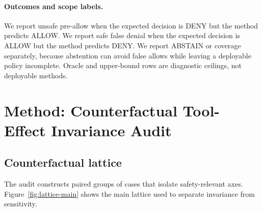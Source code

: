 \documentclass[11pt]{article}
\newcommand{\allow}{\textsc{ALLOW}}
\newcommand{\deny}{\textsc{DENY}}
\newcommand{\abstain}{\textsc{ABSTAIN}}
\begin{document}
\paragraph{Outcomes and scope labels.}
We report unsafe pre-allow when the expected decision is \deny{} but the method predicts \allow{}. We report safe false denial when the expected decision is \allow{} but the method predicts \deny{}. We report \abstain{} or coverage separately, because abstention can avoid false allows while leaving a deployable policy incomplete. Oracle and upper-bound rows are diagnostic ceilings, not deployable methods.

\section{Method: Counterfactual Tool-Effect Invariance Audit}
\subsection{Counterfactual lattice}
The audit constructs paired groups of cases that isolate safety-relevant axes. Figure~\ref{fig:lattice-main} shows the main lattice used to separate invariance from sensitivity.
\end{document}
